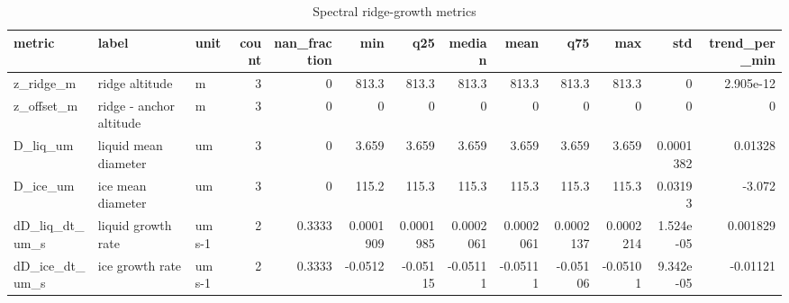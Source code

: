 \begin{table}[htbp]
\centering
\small
\caption{Spectral ridge-growth metrics}
\label{tab:growth_bundle_metrics}
\begin{tabular}{lllrrrrrrrrrr}
\toprule
metric & label & unit & count & nan\_fraction & min & q25 & median & mean & q75 & max & std & trend\_per\_min \\
\midrule
z\_ridge\_m & ridge altitude & m & 3 & 0 & 813.3 & 813.3 & 813.3 & 813.3 & 813.3 & 813.3 & 0 & 2.905e-12 \\
z\_offset\_m & ridge - anchor altitude & m & 3 & 0 & 0 & 0 & 0 & 0 & 0 & 0 & 0 & 0 \\
D\_liq\_um & liquid mean diameter & um & 3 & 0 & 3.659 & 3.659 & 3.659 & 3.659 & 3.659 & 3.659 & 0.0001382 & 0.01328 \\
D\_ice\_um & ice mean diameter & um & 3 & 0 & 115.2 & 115.3 & 115.3 & 115.3 & 115.3 & 115.3 & 0.03193 & -3.072 \\
dD\_liq\_dt\_um\_s & liquid growth rate & um s-1 & 2 & 0.3333 & 0.0001909 & 0.0001985 & 0.0002061 & 0.0002061 & 0.0002137 & 0.0002214 & 1.524e-05 & 0.001829 \\
dD\_ice\_dt\_um\_s & ice growth rate & um s-1 & 2 & 0.3333 & -0.0512 & -0.05115 & -0.05111 & -0.05111 & -0.05106 & -0.05101 & 9.342e-05 & -0.01121 \\
\bottomrule
\end{tabular}

\end{table}
